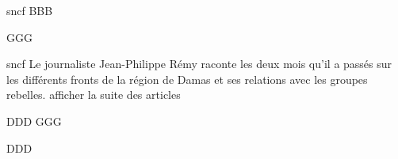 \documentclass[12pt]{book}
\begin{document}
\begin{pages}
\begin{Leftside}
\beginnumbering
\pstart
sncf
\pend
\ledheads
{}
\eledheads
BBB
\pend

\pstart
{}

GGG
\pend
\endnumbering
\end{Leftside}

\begin{Rightside}
\beginnumbering
\pstart
sncf Le journaliste Jean-Philippe Rémy raconte les deux mois qu'il a passés sur les différents fronts de la région de Damas et ses relations avec les groupes rebelles.
afficher la suite des articles

\pend
\ledheads
{}
\eledheads
DDD
\pend
\pstart
{}
\vspace{-2\parskip}\vspace{-2\baselineskip}
GGG
\pend
\endnumbering
\end{Rightside}
\Pages
\end{pages}

\beginnumbering
\ledheads
{}
\eledheads
DDD
\pend

\endnumbering
\end{document}
